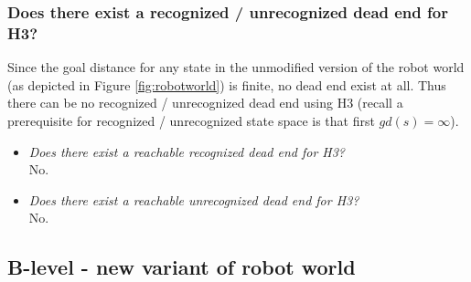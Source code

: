 \documentclass[a4paper, 11pt]{article}
\begin{document}
\subsubsection{Does there exist a recognized / unrecognized dead end for H3?}

Since the goal distance for any state in the unmodified version of the robot world (as depicted in Figure \ref{fig:robotworld}) is finite, no dead end exist at all. Thus there can be no recognized / unrecognized dead end using H3 (recall a prerequisite for recognized / unrecognized state space is that first $gd(s) = \infty$).

\begin{itemize}
    \item \textit{Does there exist a reachable recognized dead end for H3?} \\
        No.
    \item \textit{Does there exist a reachable unrecognized dead end for H3?} \\
        No.
\end{itemize}

\subsection{B-level - new variant of robot world}
\end{document}
